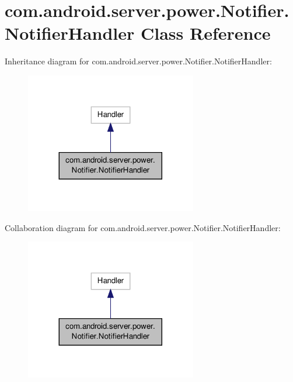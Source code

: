 \hypertarget{classcom_1_1android_1_1server_1_1power_1_1Notifier_1_1NotifierHandler}{\section{com.\-android.\-server.\-power.\-Notifier.\-Notifier\-Handler Class Reference}
\label{classcom_1_1android_1_1server_1_1power_1_1Notifier_1_1NotifierHandler}
}


Inheritance diagram for com.\-android.\-server.\-power.\-Notifier.\-Notifier\-Handler\-:
\nopagebreak
\begin{figure}[H]
\begin{center}
\leavevmode
\includegraphics[width=212pt]{classcom_1_1android_1_1server_1_1power_1_1Notifier_1_1NotifierHandler__inherit__graph}
\end{center}
\end{figure}


Collaboration diagram for com.\-android.\-server.\-power.\-Notifier.\-Notifier\-Handler\-:
\nopagebreak
\begin{figure}[H]
\begin{center}
\leavevmode
\includegraphics[width=212pt]{classcom_1_1android_1_1server_1_1power_1_1Notifier_1_1NotifierHandler__coll__graph}
\end{center}
\end{figure}
